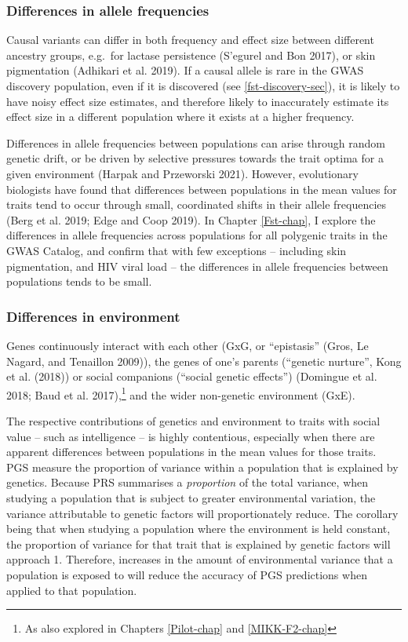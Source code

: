 \documentclass[
]{book}
\begin{document}
\hypertarget{differences-in-allele-frequencies}{%
\subsubsection{Differences in allele frequencies}\label{differences-in-allele-frequencies}}

Causal variants can differ in both frequency and effect size between different ancestry groups, e.g.~for lactase persistence (S'egurel and Bon 2017), or skin pigmentation (Adhikari et al. 2019). If a causal allele is rare in the GWAS discovery population, even if it is discovered (see \ref{fst-discovery-sec}), it is likely to have noisy effect size estimates, and therefore likely to inaccurately estimate its effect size in a different population where it exists at a higher frequency.

Differences in allele frequencies between populations can arise through random genetic drift, or be driven by selective pressures towards the trait optima for a given environment (Harpak and Przeworski 2021). However, evolutionary biologists have found that differences between populations in the mean values for traits tend to occur through small, coordinated shifts in their allele frequencies (Berg et al. 2019; Edge and Coop 2019). In Chapter \ref{Fst-chap}, I explore the differences in allele frequencies across populations for all polygenic traits in the GWAS Catalog, and confirm that with few exceptions -- including skin pigmentation, and HIV viral load -- the differences in allele frequencies between populations tends to be small.

\hypertarget{fst-env-sec}{%
\subsubsection{Differences in environment}\label{fst-env-sec}}

Genes continuously interact with each other (GxG, or ``epistasis'' (Gros, Le Nagard, and Tenaillon 2009)), the genes of one's parents (``genetic nurture'', Kong et al. (2018)) or social companions (``social genetic effects'') (Domingue et al. 2018; Baud et al. 2017),\footnote{As also explored in Chapters \ref{Pilot-chap} and \ref{MIKK-F2-chap}} and the wider non-genetic environment (GxE).

The respective contributions of genetics and environment to traits with social value -- such as intelligence -- is highly contentious, especially when there are apparent differences between populations in the mean values for those traits. PGS measure the proportion of variance within a population that is explained by genetics. Because PRS summarises a \emph{proportion} of the total variance, when studying a population that is subject to greater environmental variation, the variance attributable to genetic factors will proportionately reduce. The corollary being that when studying a population where the environment is held constant, the proportion of variance for that trait that is explained by genetic factors will approach 1. Therefore, increases in the amount of environmental variance that a population is exposed to will reduce the accuracy of PGS predictions when applied to that population.
\end{document}
